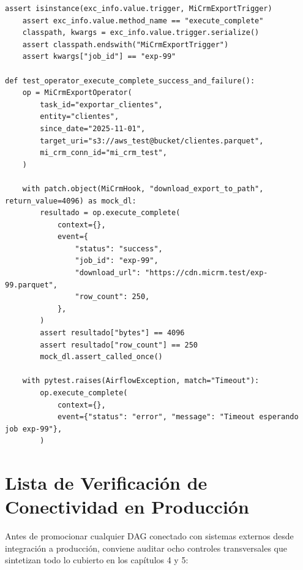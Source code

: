 \begin{lstlisting}[style=python, caption={Suite de pruebas unitarias para \texttt{MiCrmHook} y \texttt{MiCrmExportOperator} (\texttt{tests/test\_mi\_crm\_provider.py}).}, label={lst:custom-tests}]
    assert isinstance(exc_info.value.trigger, MiCrmExportTrigger)
    assert exc_info.value.method_name == "execute_complete"
    classpath, kwargs = exc_info.value.trigger.serialize()
    assert classpath.endswith("MiCrmExportTrigger")
    assert kwargs["job_id"] == "exp-99"

def test_operator_execute_complete_success_and_failure():
    op = MiCrmExportOperator(
        task_id="exportar_clientes",
        entity="clientes",
        since_date="2025-11-01",
        target_uri="s3://aws_test@bucket/clientes.parquet",
        mi_crm_conn_id="mi_crm_test",
    )

    with patch.object(MiCrmHook, "download_export_to_path", return_value=4096) as mock_dl:
        resultado = op.execute_complete(
            context={},
            event={
                "status": "success",
                "job_id": "exp-99",
                "download_url": "https://cdn.micrm.test/exp-99.parquet",
                "row_count": 250,
            },
        )
        assert resultado["bytes"] == 4096
        assert resultado["row_count"] == 250
        mock_dl.assert_called_once()

    with pytest.raises(AirflowException, match="Timeout"):
        op.execute_complete(
            context={},
            event={"status": "error", "message": "Timeout esperando job exp-99"},
        )
\end{lstlisting}

\section{Lista de Verificación de Conectividad en Producción}\label{sec:checklist-conectividad}

Antes de promocionar cualquier DAG conectado con sistemas externos desde integración a producción, conviene auditar ocho controles transversales que sintetizan todo lo cubierto en los capítulos 4 y 5:

